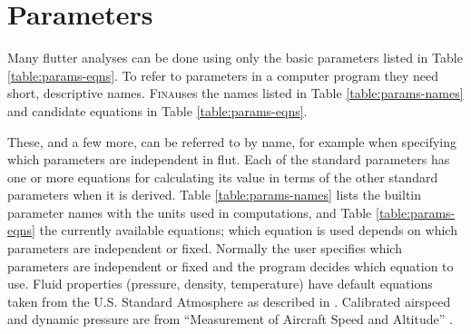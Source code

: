 \documentclass[10pt,openany,twoside]{book}
\numberwithin{equation}{section}   %
\newcommand{\Cmd}[1]{{\sf #1}}
\newcommand{\Fina}{{\normalfont\scshape Fina\:}}
\newcommand{\Eqn}[1]{Eq.\ \ref{#1}}
\newcommand{\Tableref}[1]{Table \ref{#1}}
\begin{document}
\section{Parameters}\label{sect:parameters}
Many flutter analyses can be done using only the basic parameters
listed in \Tableref{table:params-eqns}. To refer to parameters in
a computer program they need short, descriptive names. \Fina uses
the names listed in \Tableref{table:params-names} and candidate equations
in \Tableref{table:params-eqns}.

These, and a few more, can be referred to by name, for example
when specifying which parameters are independent in \Cmd{flut}.
Each of the standard parameters has one or more equations
for calculating its value in terms of the other standard parameters
when it is derived.
\Tableref{table:params-names} lists the builtin parameter names with
the units used in computations, and
\Tableref{table:params-eqns} the currently available equations; which equation is
used depends on which parameters are independent or fixed. Normally the
user specifies which parameters are independent or fixed and the program
decides which equation to use.
Fluid properties (pressure, density, temperature) have default equations taken
from the U.S. Standard Atmosphere as described in \cite{united1976us}.
Calibrated airspeed and dynamic pressure are from
``Measurement of Aircraft Speed and Altitude'' \cite{gracey1980measurement}.



\end{document}
